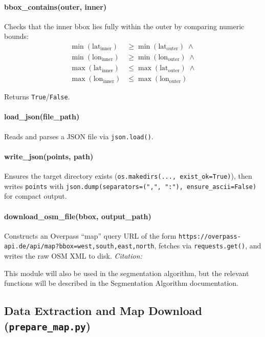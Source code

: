 \documentclass[11pt,a4paper]{article}
\begin{document}
\paragraph{bbox\_contains(outer, inner)}
Checks that the inner bbox lies fully within the outer by comparing numeric bounds:
\begin{align*}
	\min(\mathrm{lat}_{\mathrm{inner}}) & \ge \min(\mathrm{lat}_{\mathrm{outer}})\;\wedge{} \\
	\min(\mathrm{lon}_{\mathrm{inner}}) & \ge \min(\mathrm{lon}_{\mathrm{outer}})\;\wedge{} \\
	\max(\mathrm{lat}_{\mathrm{inner}}) & \le \max(\mathrm{lat}_{\mathrm{outer}})\;\wedge{} \\
	\max(\mathrm{lon}_{\mathrm{inner}}) & \le \max(\mathrm{lon}_{\mathrm{outer}})
\end{align*}

Returns \texttt{True}/\texttt{False}.

\paragraph{load\_json(file\_path)}
Reads and parses a JSON file via \texttt{json.load()}.

\paragraph{write\_json(points, path)}
Ensures the target directory exists (\texttt{os.makedirs(..., exist\_ok=True)}), then writes \texttt{points} with \texttt{json.dump(separators=(",", ":"), ensure\_ascii=False)} for compact output.

\paragraph{download\_osm\_file(bbox, output\_path)}
Constructs an Overpass “map” query URL of the form \texttt{https://overpass-api.de/api/map?bbox=west,south,east,north}, fetches via \texttt{requests.get()}, and writes the raw OSM XML to disk. \emph{Citation:} \citep{overpass}

\vspace{1ex}\noindent
This module will also be used in the segmentation algorithm, but the relevant functions will be described in the Segmentation Algorithm documentation.

\subsection{Data Extraction and Map Download (\texttt{prepare\_map.py})}
\end{document}
